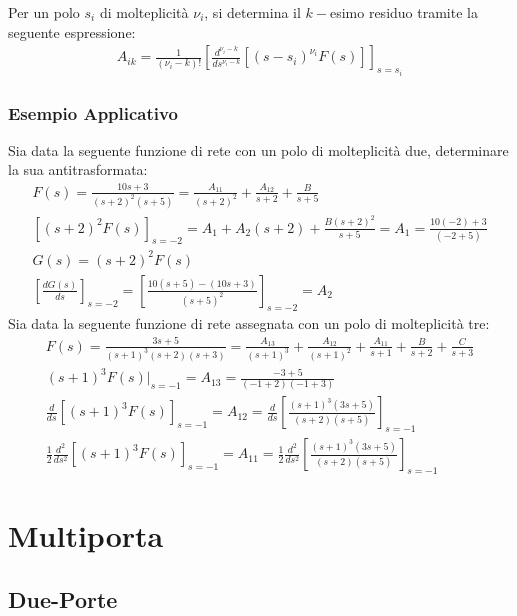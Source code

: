 \documentclass{article}
\numberwithin{equation}{subsection}
\begin{document}
Per un polo $s_i$ di molteplicità $\nu_i$, si determina il $k-$esimo residuo tramite la seguente espressione:
\begin{gather*}
    A_{ik}=\displaystyle\frac{1}{(\nu_i-k)!}\left[\frac{d^{\nu_i-k}}{ds^{\nu_i-k}}\left[(s-s_i)^{\nu_i}F(s)\right]\right]_{s=s_i}
\end{gather*}

\subsubsection{Esempio Applicativo}

Sia data la seguente funzione di rete con un polo di molteplicità due, determinare la sua antitrasformata: 
\begin{gather*}
    F(s)=\displaystyle\frac{10s+3}{(s+2)^2(s+5)}=\frac{A_{11}}{(s+2)^2}+\frac{A_{12}}{s+2}+\frac{B}{s+5}\\
    \left[(s+2)^2F(s)\right]_{s=-2}=A_1+A_2(s+2)+\displaystyle\frac{B(s+2)^2}{s+5}=A_1=\frac{10(-2)+3}{(-2+5)}\\
    G(s)=(s+2)^2F(s)\\
    \displaystyle\left[\frac{dG(s)}{ds}\right]_{s=-2}=\left[\frac{10(s+5)-(10s+3)}{(s+5)^2}\right]_{s=-2}=A_2
\end{gather*}
Sia data la seguente funzione di rete assegnata con un polo di molteplicità tre:
\begin{gather*}
    F(s)=\displaystyle\frac{3s+5}{(s+1)^3(s+2)(s+3)}=\frac{A_{13}}{(s+1)^3}+\frac{A_{12}}{(s+1)^2}+\frac{A_{11}}{s+1}+\frac{B}{s+2}+\frac{C}{s+3}\\
    (s+1)^3F(s)\bigg|_{s=-1}=A_{13}=\displaystyle\frac{-3+5}{(-1+2)(-1+3)}\\
    \displaystyle\frac{d}{ds}\left[(s+1)^3F(s)\right]_{s=-1}=A_{12}=\frac{d}{ds}\left[\frac{(s+1)^3(3s+5)}{(s+2)(s+5)}\right]_{s=-1}\\
    \frac{1}{2}\displaystyle\frac{d^2}{ds^2}\left[(s+1)^3F(s)\right]_{s=-1}=A_{11}=\frac{1}{2}\frac{d^2}{ds^2}\left[\frac{(s+1)^3(3s+5)}{(s+2)(s+5)}\right]_{s=-1}
\end{gather*}

\clearpage

\section{Multiporta}

\subsection{Due-Porte}
\end{document}

